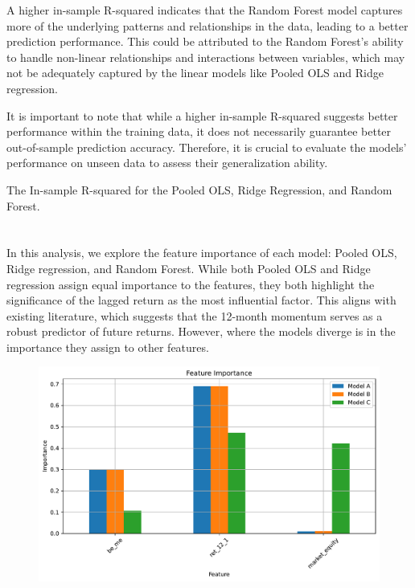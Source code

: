 \documentclass[hidelinks,12pt]{article}
\begin{document}
A higher in-sample R-squared indicates that the Random Forest model captures more of the underlying patterns and relationships in the data, leading to a better prediction performance. This could be attributed to the Random Forest's ability to handle non-linear relationships and interactions between variables, which may not be adequately captured by the linear models like Pooled OLS and Ridge regression.

It is important to note that while a higher in-sample R-squared suggests better performance within the training data, it does not necessarily guarantee better out-of-sample prediction accuracy. Therefore, it is crucial to evaluate the models' performance on unseen data to assess their generalization ability.
\begin{table}[htbp]
    \centering
    \caption{The In-sample R-squared for the Pooled OLS, Ridge Regression, and Random Forest.}
    \resizebox{!}{!}{}
\end{table}
\FloatBarrier

\section{}
In this analysis, we explore the feature importance of each model: Pooled OLS, Ridge regression, and Random Forest. While both Pooled OLS and Ridge regression assign equal importance to the features, they both highlight the significance of the lagged return as the most influential factor. This aligns with existing literature, which suggests that the 12-month momentum serves as a robust predictor of future returns.
However, where the models diverge is in the importance they assign to other features. 
\begin{figure}[htbp]
    \centering
    \includegraphics[width=.75\textwidth]{out/4.pdf}
\end{figure}
\FloatBarrier
\end{document}
